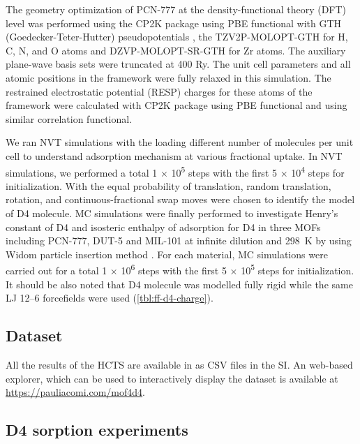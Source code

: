 The geometry optimization of PCN-777 at the density-functional theory (DFT)
level was performed using the CP2K package
\cite{vandevondeleQuickstepFastAccurate2005} using PBE functional
\citep{perdewGeneralizedGradientApproximation1996} with GTH
(Goedecker-Teter-Hutter) pseudopotentials
\citep{goedeckerSeparableDualspaceGaussian1996}, the TZV2P-MOLOPT-GTH for H, C,
N, and O atoms and DZVP-MOLOPT-SR-GTH for Zr atoms. The auxiliary plane-wave
basis sets were truncated at 400 Ry. The unit cell parameters and all atomic
positions in the framework were fully relaxed in this simulation. The restrained
electrostatic potential (RESP) charges for these atoms of the framework were
calculated with CP2K package using PBE functional and using similar correlation
functional.

We ran NVT simulations with the loading different number of molecules per unit
cell to understand adsorption mechanism at various fractional uptake. In NVT
simulations, we performed a total 1 × 10\textsuperscript{5} steps with the first
5 × 10\textsuperscript{4} steps for initialization. With the equal probability
of translation, random translation, rotation, and continuous-fractional swap
moves were chosen to identify the model of D4 molecule. MC simulations were
finally performed to investigate Henry’s constant of D4 and isosteric enthalpy
of adsorption for D4 in three MOFs including PCN-777, DUT-5 and MIL-101 at
infinite dilution and \SI{298}{\kelvin} by using Widom particle insertion method
\citep{frenkelUnderstandingMolecularSimulation2002}. For each material, MC
simulations were carried out for a total 1 × 10\textsuperscript{6} steps with
the first 5 × 10\textsuperscript{5} steps for initialization. It should be also
noted that D4 molecule was modelled fully rigid while the same LJ 12--6
forcefields were used (\cref{tbl:ff-d4-charge}).

\subsection{Dataset}

All the results of the HCTS are available in as CSV files in the SI. An
web-based explorer, which can be used to interactively display the dataset is
available at \url{https://pauliacomi.com/mof4d4}.

\subsection{D4 sorption experiments}\label{methodology-d4sorption}

